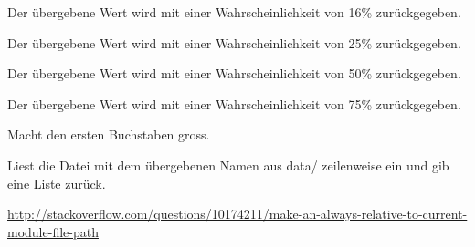 \documentclass[a4paper,12pt,oneside]{sphinxmanual}
\begin{document}
\begin{fulllineitems}
\label{module:pyzufall.helfer.e16}
Der übergebene Wert wird mit einer Wahrscheinlichkeit von 16\% zurückgegeben.

\end{fulllineitems}


\begin{fulllineitems}
\label{module:pyzufall.helfer.e25}
Der übergebene Wert wird mit einer Wahrscheinlichkeit von 25\% zurückgegeben.

\end{fulllineitems}


\begin{fulllineitems}
\label{module:pyzufall.helfer.e50}
Der übergebene Wert wird mit einer Wahrscheinlichkeit von 50\% zurückgegeben.

\end{fulllineitems}


\begin{fulllineitems}
\label{module:pyzufall.helfer.e75}
Der übergebene Wert wird mit einer Wahrscheinlichkeit von 75\% zurückgegeben.

\end{fulllineitems}


\begin{fulllineitems}
\label{module:pyzufall.helfer.erste_gross}
Macht den ersten Buchstaben gross.

\end{fulllineitems}


\begin{fulllineitems}
\label{module:pyzufall.helfer.lese}
Liest die Datei mit dem übergebenen Namen aus data/ zeilenweise ein und gib eine Liste zurück.

\href{http://stackoverflow.com/questions/10174211/make-an-always-relative-to-current-module-file-path}{http://stackoverflow.com/questions/10174211/make-an-always-relative-to-current-module-file-path}

\end{fulllineitems}
\end{document}
